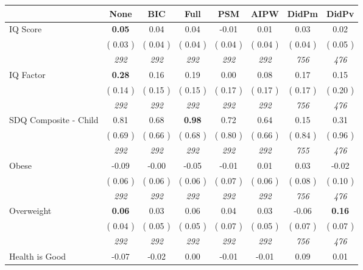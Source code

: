 \begin{tabular}{l c c c c c c c}
\toprule
 & None & BIC & Full & PSM & AIPW & DidPm & DidPv \\
\midrule
IQ Score & \textbf{      0.05 } &      0.04 &      0.04 &     -0.01 &      0.01 &      0.03 &      0.02 \\
& (     0.03 ) & (     0.04 ) & (     0.04 ) & (     0.04 ) & (     0.04 ) & (     0.04 ) & (     0.05 ) \\
& \textit{ 292 } & \textit{ 292 } & \textit{ 292 } & \textit{ 292 } & \textit{ 292 } & \textit{ 756 } & \textit{ 476 } \\
IQ Factor & \textbf{      0.28 } &      0.16 &      0.19 &      0.00 &      0.08 &      0.17 &      0.15 \\
& (     0.14 ) & (     0.15 ) & (     0.15 ) & (     0.17 ) & (     0.17 ) & (     0.17 ) & (     0.20 ) \\
& \textit{ 292 } & \textit{ 292 } & \textit{ 292 } & \textit{ 292 } & \textit{ 292 } & \textit{ 756 } & \textit{ 476 } \\
SDQ Composite - Child &      0.81 &      0.68 & \textbf{      0.98 } &      0.72 &      0.64 &      0.15 &      0.31 \\
& (     0.69 ) & (     0.66 ) & (     0.68 ) & (     0.80 ) & (     0.66 ) & (     0.84 ) & (     0.96 ) \\
& \textit{ 292 } & \textit{ 292 } & \textit{ 292 } & \textit{ 292 } & \textit{ 292 } & \textit{ 755 } & \textit{ 476 } \\
Obese &     -0.09 &     -0.00 &     -0.05 &     -0.01 &      0.01 &      0.03 &     -0.02 \\
& (     0.06 ) & (     0.06 ) & (     0.06 ) & (     0.07 ) & (     0.06 ) & (     0.08 ) & (     0.10 ) \\
& \textit{ 292 } & \textit{ 292 } & \textit{ 292 } & \textit{ 292 } & \textit{ 292 } & \textit{ 756 } & \textit{ 476 } \\
Overweight & \textbf{      0.06 } &      0.03 &      0.06 &      0.04 &      0.03 &     -0.06 & \textbf{      0.16 } \\
& (     0.04 ) & (     0.05 ) & (     0.05 ) & (     0.07 ) & (     0.05 ) & (     0.07 ) & (     0.07 ) \\
& \textit{ 292 } & \textit{ 292 } & \textit{ 292 } & \textit{ 292 } & \textit{ 292 } & \textit{ 756 } & \textit{ 476 } \\
Health is Good &     -0.07 &     -0.02 &      0.00 &     -0.01 &     -0.01 &      0.09 &      0.01 \\

\end{tabular}
